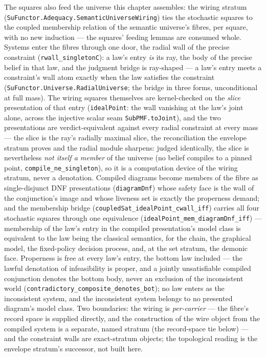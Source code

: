 The squares also feed the universe this chapter assembles: the
wiring stratum
(\texttt{SuFunctor.Adequacy.\allowbreak SemanticUniverseWiring}) ties the
stochastic squares to the coupled membership relation of the
semantic
universe's fibres, per square, with no new induction --- the
squares' feeding lemmas are consumed whole. Systems enter the
fibres through one door, the radial wall of the precise constraint
(\texttt{rwall\_singletonC}): a law's entry \emph{is} its ray, the
body of the precise belief in that law, and the judgment bridge is
ray-shaped --- a law's entry meets a constraint's wall atom exactly
when the law satisfies the constraint
(\texttt{SuFunctor.Universe.RadialUniverse}; the bridge in three
forms, unconditional at full mass). The wiring squares themselves
are kernel-checked on the \emph{slice} presentation of that entry
(\texttt{idealPoint}: the wall vanishing at the law's joint alone,
across the injective scalar seam \texttt{SubPMF.toJoint}), and the
two presentations are verdict-equivalent against every radial
constraint at every mass --- the slice is the ray's radially
maximal slice, the reconciliation the envelope stratum proves and
the radial module sharpens: judged identically, the slice is
nevertheless \emph{not itself a member} of the universe (no belief
compiles to a pinned point, \texttt{compile\_ne\_singleton}), so it
is a computation device of the wiring stratum, never a denotation.
Compiled diagrams become members of the fibre as single-disjunct
DNF presentations (\texttt{diagramDnf}) whose safety face is the
wall of
the conjunction's image and whose liveness set is exactly the
properness demand; and the membership bridge
(\texttt{coupledSat\_idealPoint\_cwall\_iff}) carries all four
stochastic squares through one equivalence
(\texttt{idealPoint\_mem\_diagramDnf\_iff}) ---
membership of the law's entry in the compiled presentation's
model class is equivalent to the law being the classical semantics,
for the chain, the graphical model, the fixed-policy decision
process, and, at the set stratum, the demonic face. Properness is
free at every law's entry, the bottom law included --- the lawful
denotation of infeasibility is proper, and a jointly unsatisfiable
compiled conjunction denotes the bottom body, never an exclusion of
the inconsistent world
(\texttt{contradictory\_composite\_denotes\_bot}); no law enters as
the inconsistent system, and the inconsistent system belongs to no
presented diagram's model class.
Two boundaries: the wiring is
\emph{per-carrier} --- the fibre's record space is supplied
directly, and the construction of the wire object from the compiled
system is a separate, named stratum (the record-space tie below)
--- and the constraint walls are exact-stratum objects; the
topological reading is the envelope stratum's successor, not built
here.

